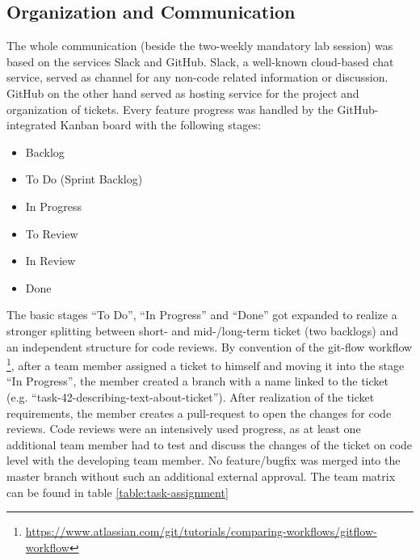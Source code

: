 \subsection{Organization and Communication}
The whole communication (beside the two-weekly mandatory lab session) was based on the services Slack and GitHub. Slack, a well-known cloud-based chat service, served as channel for any non-code related information or discussion. GitHub on the other hand served as hosting service for the project and organization of tickets. Every feature progress was handled by the GitHub-integrated Kanban board with the following stages:
\begin{itemize}
	\item Backlog
	\item To Do (Sprint Backlog)
	\item In Progress
	\item To Review
	\item In Review
	\item Done
\end{itemize}
The basic stages “To Do”, “In Progress” and “Done” got expanded to realize a stronger splitting between short- and mid-/long-term ticket (two backlogs) and an independent structure for code reviews.
By convention of the git-flow workflow \footnote{\url{https://www.atlassian.com/git/tutorials/comparing-workflows/gitflow-workflow}}, after a team member assigned a ticket to himself and moving it into the stage “In Progress”, the member created a branch with a name linked to the ticket (e.g. “task-42-describing-text-about-ticket”). After realization of the ticket requirements, the member creates a pull-request to open the changes for code reviews.
Code reviews were an intensively used progress, as at least one additional team member had to test and discuss the changes of the ticket on code level with the developing team member. No feature/bugfix was merged into the master branch without such an additional external approval. The team matrix can be found in table \ref{table:task-assignment}

